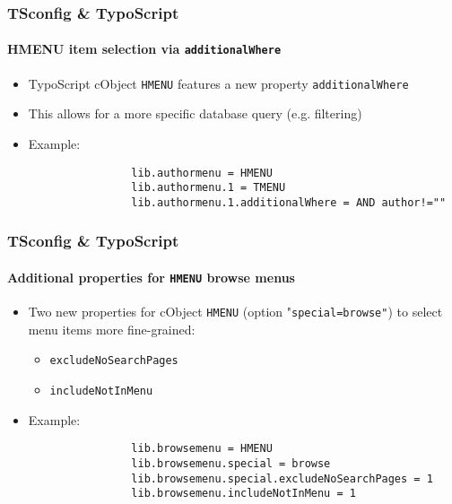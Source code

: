 \begin{frame}[fragile]
	\frametitle{TSconfig \& TypoScript}
	\framesubtitle{HMENU item selection via \texttt{additionalWhere}}

	\begin{itemize}

		\item TypoScript cObject \texttt{HMENU} features a new property \texttt{additionalWhere}
		\item This allows for a more specific database query (e.g. filtering)

		\item Example:

			\begin{lstlisting}
				lib.authormenu = HMENU
				lib.authormenu.1 = TMENU
				lib.authormenu.1.additionalWhere = AND author!=""
			\end{lstlisting}

	\end{itemize}

\end{frame}


\begin{frame}[fragile]
	\frametitle{TSconfig \& TypoScript}
	\framesubtitle{Additional properties for \texttt{HMENU} browse menus}

	\begin{itemize}
		\item Two new properties for cObject \texttt{HMENU} (option "\texttt{special=browse"})\newline
			to select menu items more fine-grained:

			\begin{itemize}
				\item \texttt{excludeNoSearchPages}
				\item \texttt{includeNotInMenu}
			\end{itemize}

		\item Example:

			\begin{lstlisting}
				lib.browsemenu = HMENU
				lib.browsemenu.special = browse
				lib.browsemenu.special.excludeNoSearchPages = 1
				lib.browsemenu.includeNotInMenu = 1
			\end{lstlisting}

	\end{itemize}

\end{frame}

